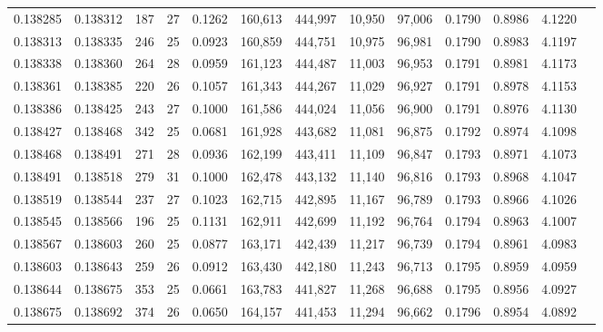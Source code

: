 \begin{tabular}{rrrrrrrrrrrrr}
0.138285 & 0.138312 & 187 &  27 &                                     0.1262 & 160,613 & 444,997 &  10,950 &  97,006 & 0.1790 & 0.8986 & 4.1220 \\
0.138313 & 0.138335 & 246 &  25 &                                     0.0923 & 160,859 & 444,751 &  10,975 &  96,981 & 0.1790 & 0.8983 & 4.1197 \\
0.138338 & 0.138360 & 264 &  28 &                                     0.0959 & 161,123 & 444,487 &  11,003 &  96,953 & 0.1791 & 0.8981 & 4.1173 \\
0.138361 & 0.138385 & 220 &  26 &                                     0.1057 & 161,343 & 444,267 &  11,029 &  96,927 & 0.1791 & 0.8978 & 4.1153 \\
0.138386 & 0.138425 & 243 &  27 &                                     0.1000 & 161,586 & 444,024 &  11,056 &  96,900 & 0.1791 & 0.8976 & 4.1130 \\
0.138427 & 0.138468 & 342 &  25 &                                     0.0681 & 161,928 & 443,682 &  11,081 &  96,875 & 0.1792 & 0.8974 & 4.1098 \\
0.138468 & 0.138491 & 271 &  28 &                                     0.0936 & 162,199 & 443,411 &  11,109 &  96,847 & 0.1793 & 0.8971 & 4.1073 \\
0.138491 & 0.138518 & 279 &  31 &                                     0.1000 & 162,478 & 443,132 &  11,140 &  96,816 & 0.1793 & 0.8968 & 4.1047 \\
0.138519 & 0.138544 & 237 &  27 &                                     0.1023 & 162,715 & 442,895 &  11,167 &  96,789 & 0.1793 & 0.8966 & 4.1026 \\
0.138545 & 0.138566 & 196 &  25 &                                     0.1131 & 162,911 & 442,699 &  11,192 &  96,764 & 0.1794 & 0.8963 & 4.1007 \\
0.138567 & 0.138603 & 260 &  25 &                                     0.0877 & 163,171 & 442,439 &  11,217 &  96,739 & 0.1794 & 0.8961 & 4.0983 \\
0.138603 & 0.138643 & 259 &  26 &                                     0.0912 & 163,430 & 442,180 &  11,243 &  96,713 & 0.1795 & 0.8959 & 4.0959 \\
0.138644 & 0.138675 & 353 &  25 &                                     0.0661 & 163,783 & 441,827 &  11,268 &  96,688 & 0.1795 & 0.8956 & 4.0927 \\
0.138675 & 0.138692 & 374 &  26 &                                     0.0650 & 164,157 & 441,453 &  11,294 &  96,662 & 0.1796 & 0.8954 & 4.0892 \\

\end{tabular}
